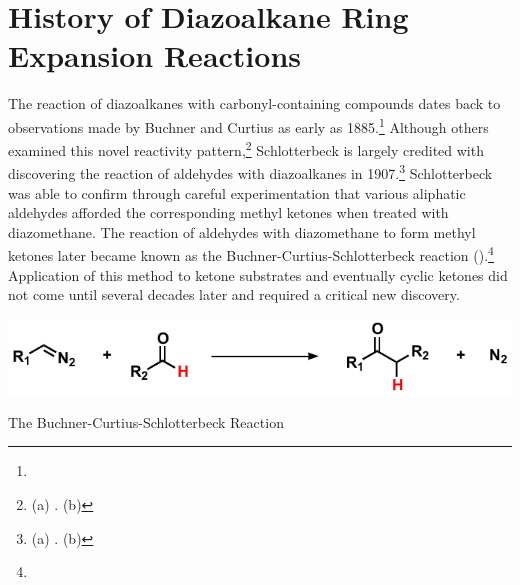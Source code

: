 \pagebreak

\section{History of Diazoalkane Ring Expansion Reactions}
The reaction of diazoalkanes with carbonyl-containing compounds dates back to
observations made by Buchner and Curtius as early as
1885.\footnote{} Although others
examined this novel reactivity pattern,\footnote{(a) . (b)
} Schlotterbeck is largely credited with discovering the
reaction of aldehydes with diazoalkanes in 1907.\footnote{(a) . (b) }
Schlotterbeck was able to confirm through careful experimentation that various
aliphatic aldehydes afforded the corresponding methyl ketones when treated with
diazomethane. The reaction of aldehydes with diazomethane to form methyl ketones
later became known as the Buchner-Curtius-Schlotterbeck
reaction ().\footnote{} Application of this method to ketone substrates and eventually cyclic
ketones did not come until several decades later and required a critical new
discovery. 

\begin{Scheme}[ht]
  \centering
  \includegraphics[scale=0.8]{chp_diazobkg/images/bcs}
  \caption{The Buchner-Curtius-Schlotterbeck Reaction}
  \label{sch:bcs}
\end{Scheme}

